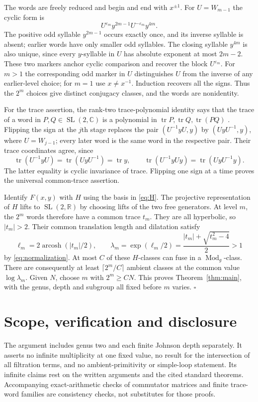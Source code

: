 \documentclass[11pt]{article}
\theoremstyle{remark}\newtheorem*{remark}{Remark}
\newcommand{\Mod}{\operatorname{Mod}}
\newcommand{\tr}{\operatorname{tr}}
\newcommand{\SL}{\operatorname{SL}}
\begin{document}
The words are freely reduced and begin and end with $x^{\pm1}$.
For $U=W_{m-1}$ the cyclic form is
\[
 U^{\varepsilon_m}y^{2m-1}U^{-\varepsilon_m}y^{4m}.
\]
The positive odd syllable $y^{2m-1}$ occurs exactly once, and its inverse
syllable is absent; earlier words have only smaller odd syllables.
The closing syllable $y^{4m}$ is also unique, since every $y$-syllable
in $U$ has absolute exponent at most $2m-2$. These two markers
anchor cyclic comparison and recover the block $U^{\varepsilon_m}$. For $m>1$ the corresponding odd marker
in $U$ distinguishes $U$ from the inverse of any earlier-level choice;
for $m=1$ use $x\ne x^{-1}$. Induction recovers all the signs.
Thus the $2^m$ choices give distinct conjugacy classes, and the words
are nonidentity.

For the trace assertion, the rank-two trace-polynomial identity says
that the trace of a word in $P,Q\in\SL(2,\mathbb C)$ is a polynomial
in $\tr P,\tr Q,\tr(PQ)$
\cite[Theorem 3.1 and Corollary 3.14]{Horowitz}.
Flipping the sign at the $j$th stage replaces the pair
$(U^{-1}yU,y)$ by $(UyU^{-1},y)$, where $U=W_{j-1}$; every later
word is the same word in the respective pair. Their trace coordinates
agree, since
\[
 \tr(U^{-1}yU)=\tr(UyU^{-1})=\tr y,\qquad
 \tr(U^{-1}yUy)=\tr(UyU^{-1}y).
\]
The latter equality is cyclic invariance of trace. Flipping one sign
at a time proves the universal common-trace assertion.

Identify $F(x,y)$ with $H$ using the basis in \eqref{eq:H}.
The projective representation of $H$ lifts to $\SL(2,\mathbb R)$ by
choosing lifts of the two free generators. At level $m$, the $2^m$
words therefore have a common trace $t_m$. They are all hyperbolic,
so $|t_m|>2$. Their common translation length and dilatation satisfy
\[
 \ell_m=2\operatorname{arcosh}(|t_m|/2),\qquad
 \lambda_m=\exp(\ell_m/2)
           =\frac{|t_m|+\sqrt{t_m^2-4}}2>1
\]
by \eqref{eq:normalization}. At most $C$ of these $H$-classes can fuse
in a $\Mod_g$-class. There are consequently at least
$\lceil2^m/C\rceil$ ambient classes at the common value
$\log\lambda_m$. Given $N$, choose $m$ with $2^m\ge CN$.
This proves Theorem~\ref{thm:main}, with the genus, depth and subgroup
all fixed before $m$ varies. \hfill$\square$

\section*{Scope, verification and disclosure}
The argument includes genus two and each finite Johnson depth
separately. It asserts no infinite multiplicity at one fixed value,
no result for the intersection of all filtration terms, and no
ambient-primitivity or simple-loop statement. Its infinite claims rest
on the written arguments and the cited standard theorems. Accompanying
exact-arithmetic checks of commutator matrices and finite trace-word
families are consistency checks, not substitutes for those proofs.
\end{document}
